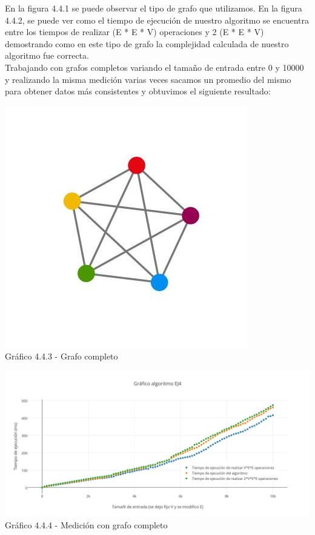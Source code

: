 En la figura 4.4.1 se puede observar el tipo de grafo que utilizamos. En la figura 4.4.2, se puede ver como el tiempo de ejecución de nuestro algoritmo se encuentra entre los tiempos de realizar (E * E * V)  operaciones y 2 (E * E * V)  demostrando como en este tipo de grafo la complejidad calculada de nuestro algoritmo fue correcta.\\




Trabajando con grafos completos variando el tamaño de entrada entre 0 y 10000 y realizando la misma medición varias veces sacamos un promedio del mismo para obtener datos más consistentes y obtuvimos el siguiente resultado:

\vspace*{0.3cm} \vspace*{0.3cm}
  \begin{center}
 \includegraphics[scale=0.5]{./ej4/completo.jpg}
 	{\\Gráfico 4.4.3 - Grafo completo}
  \end{center}
  \vspace*{0.3cm}
  
  \vspace*{0.3cm} \vspace*{0.3cm}
  \begin{center}
 \includegraphics[scale=0.28]{./ej4/completo2.jpg}
 	{Gráfico 4.4.4 - Medición con grafo completo}
  \end{center}
  \vspace*{0.3cm}


